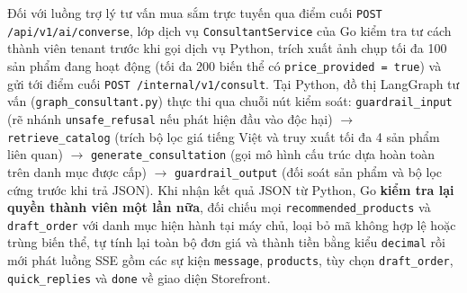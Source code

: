 

Đối với luồng trợ lý tư vấn mua sắm trực tuyến qua điểm cuối \texttt{POST /\hspace{0pt}api/\hspace{0pt}v1/\hspace{0pt}ai/\hspace{0pt}converse}, lớp dịch vụ \texttt{Consultant\hspace{0pt}Service} của Go kiểm tra tư cách thành viên tenant trước khi gọi dịch vụ Python, trích xuất ảnh chụp tối đa 100 sản phẩm đang hoạt động (tối đa 200 biến thể có \texttt{price\_\hspace{0pt}provided = true}) và gửi tới điểm cuối \texttt{POST /\hspace{0pt}internal/\hspace{0pt}v1/\hspace{0pt}consult}.
Tại Python, đồ thị LangGraph tư vấn (\texttt{graph\_\hspace{0pt}consultant.\hspace{0pt}py}) thực thi qua chuỗi nút kiểm soát: \texttt{guardrail\_\hspace{0pt}input} (rẽ nhánh \texttt{unsafe\_\hspace{0pt}refusal} nếu phát hiện đầu vào độc hại) $\rightarrow$ \texttt{retrieve\_\hspace{0pt}catalog} (trích bộ lọc giá tiếng Việt và truy xuất tối đa 4 sản phẩm liên quan) $\rightarrow$ \texttt{generate\_\hspace{0pt}consultation} (gọi mô hình cấu trúc dựa hoàn toàn trên danh mục được cấp) $\rightarrow$ \texttt{guardrail\_\hspace{0pt}output} (đối soát sản phẩm và bộ lọc cứng trước khi trả JSON).
Khi nhận kết quả JSON từ Python, Go \textbf{kiểm tra lại quyền thành viên một lần nữa}, đối chiếu mọi \texttt{recommended\_\hspace{0pt}products} và \texttt{draft\_\hspace{0pt}order} với danh mục hiện hành tại máy chủ, loại bỏ mã không hợp lệ hoặc trùng biến thể, tự tính lại toàn bộ đơn giá và thành tiền bằng kiểu \texttt{decimal} rồi mới phát luồng SSE gồm các sự kiện \texttt{message}, \texttt{products}, tùy chọn \texttt{draft\_\hspace{0pt}order}, \texttt{quick\_\hspace{0pt}replies} và \texttt{done} về giao diện Storefront.
